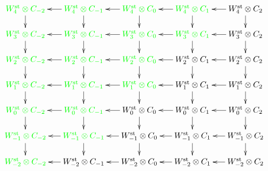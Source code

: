 \[
	\xymatrix@R=.5cm@C=.5cm{
		\green{\Wst[4] \ot C_{-2}}\ar[d] &
		\green{\Wst[4] \ot C_{-1}}\ar[d]\ar[l] &
		\green{\Wst[4] \ot C_{0}}\ar[d]\ar[l] &
		\green{\Wst[4] \ot C_{1}}\ar[d]\ar[l] &
		\Wst[4] \ot C_{2}\ar[d]\ar[l]
		\\
		\green{\Wst[3] \ot C_{-2}}\ar[d] &
		\green{\Wst[3] \ot C_{-1}}\ar[d]\ar[l] &
		\green{\Wst[3] \ot C_{0}}\ar[d]\ar[l] &
		\green{\Wst[3] \ot C_{1}}\ar[d]\ar[l] &
		\Wst[3] \ot C_{2}\ar[d]\ar[l]
		\\
		\green{\Wst[2] \ot C_{-2}}\ar[d] &
		\green{\Wst[2] \ot C_{-1}}\ar[d]\ar[l] &
		\green{\Wst[2] \ot C_{0}}\ar[d]\ar[l] &
		\Wst[2] \ot C_{1}\ar[d]\ar[l] &
		\Wst[2] \ot C_{2}\ar[d]\ar[l]
		\\
		\green{\Wst[1] \ot C_{-2}}\ar[d] &
		\green{\Wst[1] \ot C_{-1}}\ar[d]\ar[l] &
		\green{\Wst[1] \ot C_{0}}\ar[d]\ar[l] &
		\Wst[1] \ot C_{1}\ar[d]\ar[l] &
		\Wst[1] \ot C_{2}\ar[d]\ar[l]
		\\
		\green{\Wst[0] \ot C_{-2}}\ar[d] &
		\green{\Wst[0] \ot C_{-1}}\ar[d]\ar[l] &
		\Wst[0] \ot C_{0}\ar[d]\ar[l] &
		\Wst[0] \ot C_{1}\ar[d]\ar[l] &
		\Wst[0] \ot C_{2}\ar[d]\ar[l]
		\\
		\green{\Wst[-1] \ot C_{-2}}\ar[d] &
		\green{\Wst[-1] \ot C_{-1}}\ar[d]\ar[l] &
		\Wst[-1] \ot C_{0}\ar[d]\ar[l] &
		\Wst[-1] \ot C_{1}\ar[d]\ar[l] &
		\Wst[-1] \ot C_{2}\ar[d]\ar[l]
		\\
		\green{\Wst[-2] \ot C_{-2}} &
		\Wst[-2] \ot C_{-1}\ar[l] &
		\Wst[-2] \ot C_{0}\ar[l] &
		\Wst[-2] \ot C_{1}\ar[l] &
		\Wst[-2] \ot C_{2}\ar[l]
}
\]